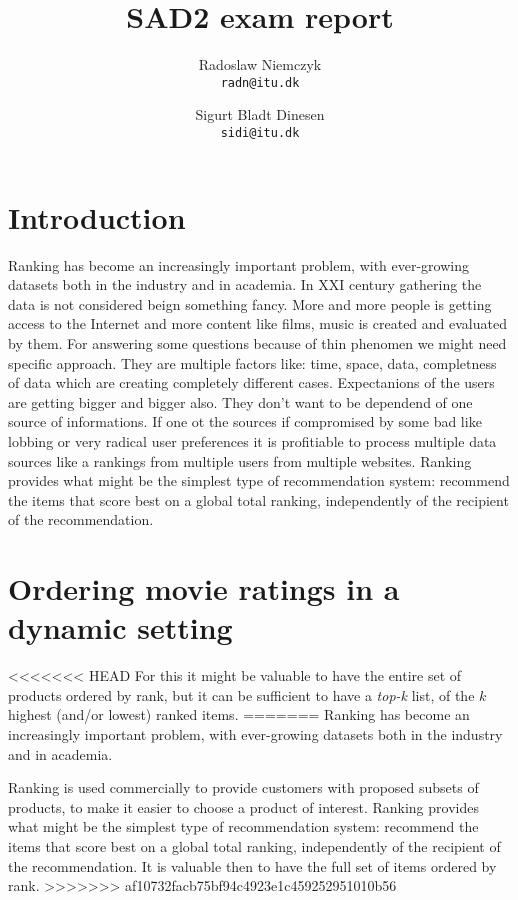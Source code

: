 \documentclass[a4paper, titlepage]{report}
\renewcommand{\%}{\scalebox{.9}{\oldpct}}
\begin{document}
\title{SAD2 exam report}
\author{
	Radoslaw Niemczyk
	\\\texttt{radn@itu.dk}
	\and
	Sigurt Bladt Dinesen
	\\\texttt{sidi@itu.dk}
}

\maketitle

\section*{Introduction}
Ranking has become an increasingly important problem, with ever-growing datasets
both in the industry and in academia. In XXI century gathering the data is not
considered beign something fancy. More and more people is getting access to the
Internet and more content like films, music is created and evaluated by them.
For answering some questions because of thin phenomen
we might need specific approach. They are multiple factors
like: time, space, data, completness of data which are creating completely different
cases.
Expectanions of the users are getting bigger and bigger also. They don't want to
be dependend of one source of informations. If one ot the sources if compromised
by some bad like lobbing or very radical user preferences it is profitiable to
process multiple data sources like a rankings from multiple users from multiple
websites.
Ranking provides what might be the simplest type of recommendation system:
recommend the items that score best on a global total ranking, independently of
the recipient of the recommendation.
\section*{Ordering movie ratings in a dynamic setting}
<<<<<<< HEAD
For this it might be valuable to have the entire set of products ordered by
rank, but it can be sufficient to have a \textit{top-k} list, of the $k$ highest
(and/or lowest) ranked items.
=======
Ranking has become an increasingly important problem, with ever-growing datasets
both in the industry and in academia.

Ranking is used commercially to provide customers with proposed subsets of
products, to make it easier to choose a product of interest.
Ranking provides what might be the simplest type of recommendation system:
recommend the items that score best on a global total ranking, independently of
the recipient of the recommendation.
It is valuable then to have the full set of items ordered by
rank.
>>>>>>> af10732facb75bf94c4923e1c459252951010b56
\end{document}
